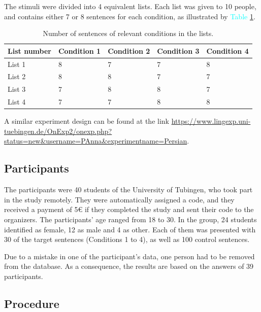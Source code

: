 \documentclass[12pt,a4paper]{article}
\begin{document}
The stimuli were divided into 4 equivalent lists. Each list was given to 10 people, and contains either 7 or 8 sentences for each condition, as illustrated by \textcolor{cyan}{Table \ref{Table 2}}.


\begin{table}[h]
\captionsetup{font=scriptsize}
\begin{tabular}{||l|l|l|l|l||}
\hline
\textbf{List number} & \textbf{Condition 1} & \textbf{Condition 2} & \textbf{Condition 3} & \textbf{Condition 4}\\
\hline \hline

List 1 & 8 & 7 & 7 & 8\\

List 2 & 8 & 8 & 7 & 7\\

List 3 & 7 & 8 & 8 & 7\\

List 4 & 7 & 7 & 8 & 8\\

\hline
\end{tabular}
\caption{Number of sentences of relevant conditions in the lists.}
\label{Table 2}
\end{table}

A similar experiment design can be found at the link \textcolor{cyan}{\url{https://www.lingexp.uni-tuebingen.de/OnExp2/onexp.php?status=new&username=PAnna&experimentname=Persian}}. 

\subsection{Participants}

The participants were 40 students of the University of Tubingen, who took part in the study remotely. They were automatically assigned a code, and they received a payment of 5€ if they completed the study and sent their code to the organizers. The participants' age ranged from 18 to 30. In the group, 24 students identified as female, 12 as male and 4 as other. Each of them was presented with 30 of the target sentences (Conditions 1 to 4), as well as 100 control sentences.

Due to a mistake in one of the participant's data, one person had to be removed from the database. As a consequence, the results are based on the answers of 39 participants.

\subsection{Procedure}
\end{document}
